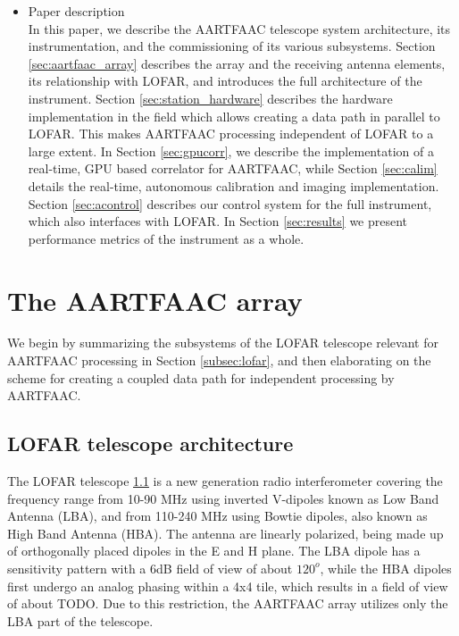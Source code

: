 \documentclass{aa}
\begin{document}
\begin{itemize}
\item Paper description \\
In  this paper,  we describe  the  AARTFAAC telescope  system architecture,  its
instrumentation,  and  the commissioning  of  its  various subsystems.   Section
\ref{sec:aartfaac_array} describes the array and the receiving antenna elements,
its  relationship  with LOFAR,  and  introduces  the  full architecture  of  the
instrument.    Section   \ref{sec:station_hardware}   describes   the   hardware
implementation in  the field which  allows creating a  data path in  parallel to
LOFAR. This  makes AARTFAAC processing independent  of LOFAR to a  large extent.
In Section \ref{sec:gpucorr}, we describe the implementation of a real-time, GPU
based  correlator  for  AARTFAAC,  while  Section  \ref{sec:calim}  details  the
real-time,   autonomous  calibration   and   imaging  implementation.    Section
\ref{sec:acontrol} describes our  control system for the  full instrument, which
also interfaces with LOFAR.  In Section \ref{sec:results} we present performance
metrics of the instrument as a whole.
\end{itemize}

\section {\label{sec:aartfaac_array}The AARTFAAC array}
We  begin by  summarizing the  subsystems of  the LOFAR  telescope relevant  for
AARTFAAC processing in  Section \ref{subsec:lofar}, and then  elaborating on the
scheme for creating a coupled data path for independent processing by AARTFAAC.

\subsection {\label{subsec:lofar} LOFAR telescope architecture}
The LOFAR telescope \ref{} is a new generation radio interferometer covering the
frequency  range from  10-90  MHz using  inverted V-dipoles  known  as Low  Band
Antenna (LBA),  and from 110-240  MHz using Bowtie  dipoles, also known  as High
Band  Antenna (HBA).   The  antenna are  linearly polarized,  being  made up  of
orthogonally  placed  dipoles in  the  E  and H  plane.  The  LBA dipole  has  a
sensitivity pattern  with a 6dB  field of view of  about $120^o$, while  the HBA
dipoles first undergo  an analog phasing within  a 4x4 tile, which  results in a
field  of view  of  about TODO.  Due  to this  restriction,  the AARTFAAC  array
utilizes only the LBA part of the telescope.
\end{document}

